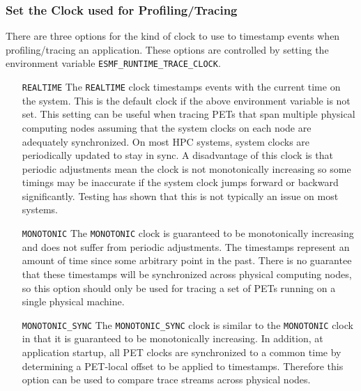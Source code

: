 \subsubsection{Set the Clock used for Profiling/Tracing}
\label{sec:TracingClocks}

There are three options for the kind of clock to use to timestamp
events when profiling/tracing an application.
These options are controlled by setting the environment variable
{\tt ESMF\_RUNTIME\_TRACE\_CLOCK}.
\begin{itemize}
\item [{\tt REALTIME}] The {\tt REALTIME} clock timestamps events with the current time on
      the system.  This is the default clock if the above environment
      variable is not set.  This setting can be useful when tracing PETs that
      span multiple physical computing nodes assuming that the system clocks
      on each node are adequately synchronized.  On most HPC systems, system
      clocks are periodically updated to stay in sync.  A disadvantage of this
      clock is that periodic adjustments mean the clock is not monotonically
      increasing so some timings may be inaccurate if the system clock jumps
      forward or backward significantly. Testing has shown that this is not
      typically an issue on most systems.
\item [{\tt MONOTONIC}] The {\tt MONOTONIC} clock is guaranteed to be monotonically increasing
      and does not suffer from periodic adjustments.  The timestamps represent
      an amount of time since some arbitrary point in the past.  There is no
      guarantee that these timestamps will be synchronized across physical
      computing nodes, so this option should only be used for tracing a set of PETs
      running on a single physical machine.
\item [{\tt MONOTONIC\_SYNC}] The {\tt MONOTONIC\_SYNC} clock is similar to the {\tt MONOTONIC} clock
      in that it is guaranteed to be monotonically increasing. In addition, at
      application startup, all PET clocks are synchronized to a common time
      by determining a PET-local offset to be applied to timestamps. Therefore this option
      can be used to compare trace streams across physical nodes.     
\end{itemize}
